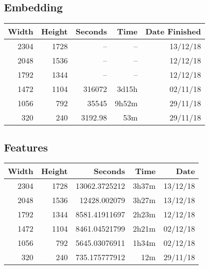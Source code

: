 \subsection{Embedding}
  \begin{center}
  \begin{tabular}{ r r | r r r }
  Width & Height & Seconds & Time & Date Finished \\ \hline
  2304 & 1728 & -- & -- & 13/12/18 \\
  2048 & 1536 & -- & -- & 12/12/18 \\
  1792 & 1344 & -- & -- & 12/12/18 \\
  1472 & 1104 & 316072 & 3d15h & 02/11/18 \\
  1056 & 792 & 35545 & 9h52m & 29/11/18 \\
  320 & 240 & 3192.98 & 53m & 29/11/18 \\
  \end{tabular}
  \end{center}

\subsection{Features}
  \begin{center}
  \begin{tabular}{ r r | r r r }
  Width & Height & Seconds & Time & Date \\ \hline
  2304 & 1728 & 13062.3725212 & 3h37m & 13/12/18 \\
  2048 & 1536 & 12428.002079 & 3h27m & 13/12/18 \\
  1792 & 1344 & 8581.41911697 & 2h23m & 12/12/18 \\
  1472 & 1104 & 8461.04521799 & 2h21m & 02/12/18 \\
  1056 & 792 & 5645.03076911 & 1h34m & 02/12/18 \\
  320 & 240 & 735.175777912 & 12m & 29/11/18 \\
  \end{tabular}
  \end{center}

